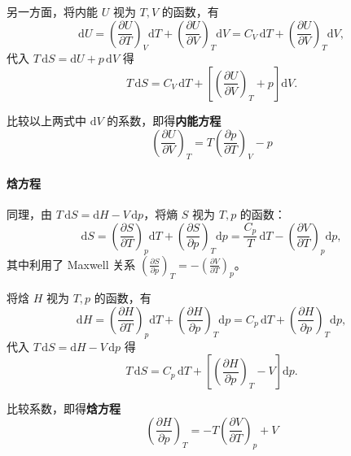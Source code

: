\documentclass[UTF8]{ctexart}
\theoremstyle{definition}
\begin{document}
另一方面，将内能 $U$ 视为 $T,V$ 的函数，有
\begin{equation}
\mathrm{d}U = \left(\frac{\partial U}{\partial T}\right)_V\mathrm{d}T + \left(\frac{\partial U}{\partial V}\right)_T\mathrm{d}V
= C_V\,\mathrm{d}T + \left(\frac{\partial U}{\partial V}\right)_T\mathrm{d}V,
\end{equation}
代入 $T\,\mathrm{d}S = \mathrm{d}U + p\,\mathrm{d}V$ 得
\begin{equation}
T\,\mathrm{d}S = C_V\,\mathrm{d}T + \left[\left(\frac{\partial U}{\partial V}\right)_T + p\right]\mathrm{d}V.
\end{equation}

比较以上两式中 $\mathrm{d}V$ 的系数，即得\textbf{内能方程}
\begin{equation}
\boxed{\left(\frac{\partial U}{\partial V}\right)_T = T\left(\frac{\partial p}{\partial T}\right)_V - p}
\end{equation}

\paragraph{焓方程}

同理，由 $T\,\mathrm{d}S = \mathrm{d}H - V\,\mathrm{d}p$，将熵 $S$ 视为 $T,p$ 的函数：
\begin{equation}
\mathrm{d}S = \left(\frac{\partial S}{\partial T}\right)_p\mathrm{d}T + \left(\frac{\partial S}{\partial p}\right)_T\mathrm{d}p
= \frac{C_p}{T}\,\mathrm{d}T - \left(\frac{\partial V}{\partial T}\right)_p\mathrm{d}p,
\end{equation}
其中利用了 Maxwell 关系 $\displaystyle\left(\frac{\partial S}{\partial p}\right)_T = -\left(\frac{\partial V}{\partial T}\right)_p$。

将焓 $H$ 视为 $T,p$ 的函数，有
\begin{equation}
\mathrm{d}H = \left(\frac{\partial H}{\partial T}\right)_p\mathrm{d}T + \left(\frac{\partial H}{\partial p}\right)_T\mathrm{d}p
= C_p\,\mathrm{d}T + \left(\frac{\partial H}{\partial p}\right)_T\mathrm{d}p,
\end{equation}
代入 $T\,\mathrm{d}S = \mathrm{d}H - V\,\mathrm{d}p$ 得
\begin{equation}
T\,\mathrm{d}S = C_p\,\mathrm{d}T + \left[\left(\frac{\partial H}{\partial p}\right)_T - V\right]\mathrm{d}p.
\end{equation}

比较系数，即得\textbf{焓方程}
\begin{equation}
\boxed{\left(\frac{\partial H}{\partial p}\right)_T = -T\left(\frac{\partial V}{\partial T}\right)_p + V}
\end{equation}
\end{document}
